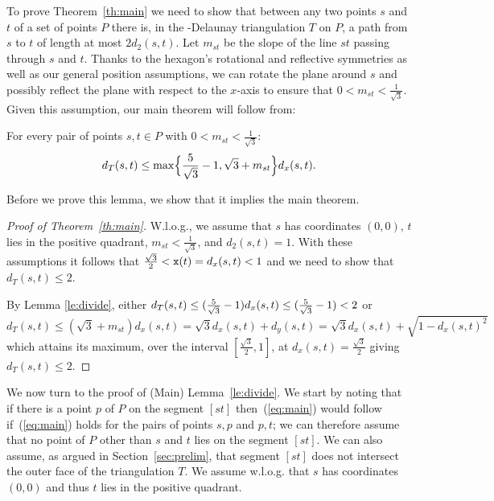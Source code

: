 To prove Theorem~\ref{th:main} we need to show that between any two points
$s$ and
$t$ of a set of points $P$ there is, in the {\Large\varhexagon}-Delaunay
triangulation $T$ on $P$, a path from $s$ to $t$ of length
at most $2d_2(s,t)$. Let $m_{st}$ be the slope of the line $st$ 
passing through $s$ and $t$.
Thanks to the hexagon's rotational and reflective symmetries as well as our general 
position assumptions, we can rotate
the plane around $s$ and possibly reflect the plane with respect to the $x$-axis
to ensure that %
$0 < m_{st} < \frac{1}{\sqrt{3}}$. Given this assumption, our main theorem
will follow from:
\begin{lemma} \label{le:divide}
For every pair of points $s,t \in P$ with 
$0 < m_{st} < \frac{1}{\sqrt{3}}$:
\begin{equation}
\label{eq:main}
d_T(s,t) \leq \max\Bigl\{\frac{5}{\sqrt{3}}-1, \sqrt{3}+m_{st}\Bigr\}d_x(s,t).
\end{equation}
\end{lemma}
Before we prove this lemma, we show that it implies the main theorem.
\begin{proof}[Proof of Theorem~\ref{th:main}]
W.l.o.g., we assume that $s$ has coordinates $(0,0)$, $t$ lies in the
positive quadrant, $m_{st} < \frac{1}{\sqrt{3}}$, and $d_2(s,t)=1$.
With these assumptions it follows that 
$\frac{\sqrt{3}}{2} < {\tt x}(t) = d_x(s,t) < 1$
and we need to show that $d_T(s,t) \leq 2$.


By Lemma \ref{le:divide}, either 
$d_T(s,t)\leq (\frac{5}{\sqrt{3}}-1) d_x(s,t) \leq (\frac{5}{\sqrt{3}}-1) < 2$ or
 \[d_T(s,t) \leq (\sqrt{3}+m_{st}) d_x(s,t) = \sqrt{3}d_x(s,t) + d_y(s,t) = \sqrt{3}d_x(s,t)+ \sqrt{1-d_x(s,t)^2}\]
 which attains its maximum, over the interval $[\frac{\sqrt{3}}{2},1]$, at 
$d_x(s,t)=\frac{\sqrt{3}}{2}$ giving $d_T(s,t) \leq 2$.
\end{proof}

We now turn to the proof of (Main) Lemma~\ref{le:divide}. We start by noting that if
there is a point $p$ of $P$ on the segment $[st]$
then~(\ref{eq:main}) would follow if~(\ref{eq:main}) holds for the pairs
of points $s,p$ and $p,t$; we can therefore assume that no point of $P$ other
than $s$ and $t$ lies on the segment $[st]$. We can also assume, as argued in
Section~\ref{sec:prelim}, that segment
$[st]$ does not intersect the outer face of the triangulation $T$.
We assume w.l.o.g. that
$s$ has coordinates $(0,0)$ and thus $t$ lies in the positive quadrant.%

